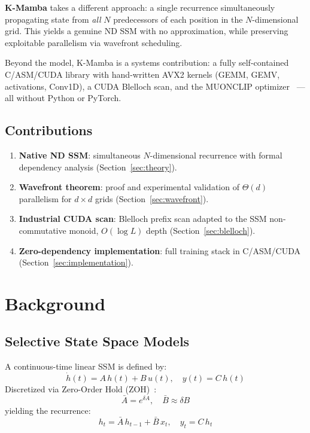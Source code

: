 \documentclass[10pt,twocolumn]{article}
\begin{document}
\textbf{K-Mamba} takes a different approach: a single recurrence
simultaneously propagating state from \emph{all} $N$ predecessors of each
position in the $N$-dimensional grid.
This yields a genuine ND SSM with no approximation, while preserving
exploitable parallelism via wavefront scheduling.

Beyond the model, K-Mamba is a systems contribution:
a fully self-contained C/ASM/CUDA library with hand-written
AVX2 kernels (GEMM, GEMV, activations, Conv1D), a CUDA Blelloch scan,
and the MUONCLIP optimizer~\cite{muon2025} — all without Python or PyTorch.

\subsection*{Contributions}

\begin{enumerate}
  \item \textbf{Native ND SSM}: simultaneous $N$-dimensional recurrence
        with formal dependency analysis (Section~\ref{sec:theory}).
  \item \textbf{Wavefront theorem}: proof and experimental validation of
        $\Theta(d)$ parallelism for $d \times d$ grids (Section~\ref{sec:wavefront}).
  \item \textbf{Industrial CUDA scan}: Blelloch prefix scan adapted
        to the SSM non-commutative monoid, $O(\log L)$ depth
        (Section~\ref{sec:blelloch}).
  \item \textbf{Zero-dependency implementation}: full training stack
        in C/ASM/CUDA (Section~\ref{sec:implementation}).
\end{enumerate}

\section{Background}

\subsection{Selective State Space Models}

A continuous-time linear SSM is defined by:
\begin{equation}
  \dot{h}(t) = A\,h(t) + B\,u(t), \quad y(t) = C\,h(t)
\end{equation}
Discretized via Zero-Order Hold (ZOH)~\cite{s4}:
\begin{equation}
  \bar{A} = e^{\delta A}, \quad
  \bar{B} \approx \delta B
\end{equation}
yielding the recurrence:
\begin{equation}
  h_t = \bar{A}\,h_{t-1} + \bar{B}\,x_t, \quad y_t = C\,h_t
\end{equation}
\end{document}
